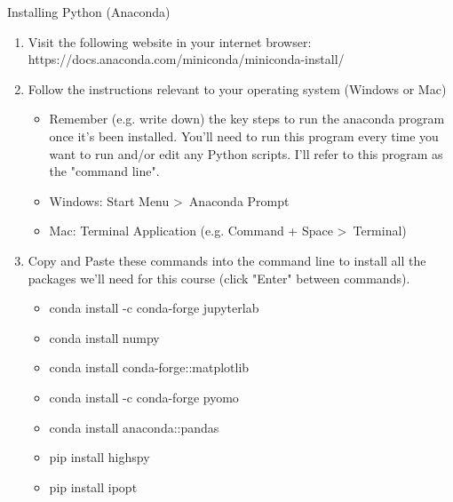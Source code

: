 \documentclass[10pt, aspectratio=169]{beamer}
\begin{document}
\begin{frame}{Installing Python (Anaconda)}
    \begin{enumerate}
        \item Visit the following website in your internet browser: https://docs.anaconda.com/miniconda/miniconda-install/
        \item Follow the instructions relevant to your operating system (Windows or Mac)
        \begin{itemize}
            \item Remember (e.g. write down) the key steps to run the anaconda program once it's been installed. You'll need to run this program every time you want to run and/or edit any Python scripts. I'll refer to this program as the "command line".
            \item Windows: Start Menu \textgreater\ Anaconda Prompt
            \item Mac: Terminal Application (e.g. Command + Space \textgreater\ Terminal)
        \end{itemize}
        \item Copy and Paste these commands into the command line to install all the packages we'll need for this course (click "Enter" between commands).
        \begin{itemize}
            \item conda install -c conda-forge jupyterlab
            \item conda install numpy
            \item conda install conda-forge::matplotlib
            \item conda install -c conda-forge pyomo
            \item conda install anaconda::pandas
            \item pip install highspy
            \item pip install ipopt
        \end{itemize}
    \end{enumerate}
\end{frame}
\end{document}
